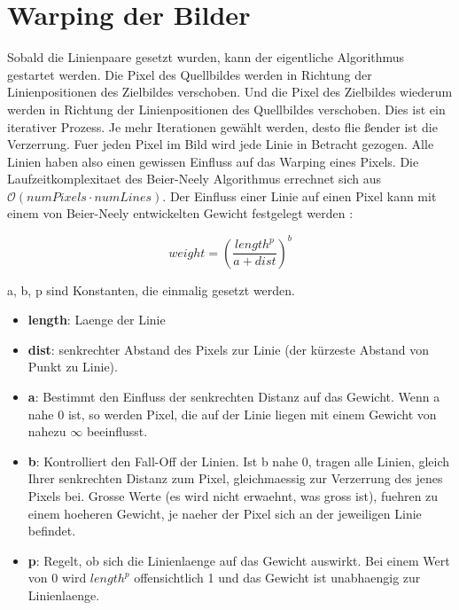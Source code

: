 \chapter{Warping der Bilder}

Sobald die Linienpaare gesetzt wurden, kann der eigentliche Algorithmus gestartet werden. Die Pixel
des Quellbildes werden in Richtung der Linienpositionen des Zielbildes verschoben. Und die Pixel
des Zielbildes wiederum werden in Richtung der Linienpositionen des Quellbildes verschoben.
Dies ist ein iterativer Prozess. Je mehr Iterationen gewählt werden, desto flie \ss ender ist
die Verzerrung.
Fuer jeden Pixel im Bild wird jede Linie in Betracht gezogen. Alle Linien haben also einen gewissen Einfluss auf
das Warping eines Pixels. Die Laufzeitkomplexitaet
des Beier-Neely Algorithmus errechnet sich aus
$\mathcal{O}(numPixels \cdot numLines)$.
Der Einfluss einer Linie auf einen Pixel kann mit einem
von Beier-Neely entwickelten Gewicht festgelegt werden
\cite{beierneely}:

\begin{equation}
	weight = \left(\frac{length^{p}}{a+dist}\right)^{b}
\end{equation}

a, b, p sind Konstanten, die einmalig gesetzt werden.

\begin{itemize}
	\item \textbf{length}: Laenge der Linie
	\item \textbf{dist}: senkrechter Abstand des Pixels zur Linie (der kürzeste Abstand
	von Punkt zu Linie).
	\item \textbf{a}: Bestimmt den Einfluss der senkrechten Distanz
	auf das Gewicht. Wenn a nahe 0 ist, so werden Pixel, die auf der
	Linie liegen mit einem Gewicht von nahezu $\infty$ beeinflusst.
	\item \textbf{b}: Kontrolliert den Fall-Off der Linien. Ist b
	nahe 0, tragen alle Linien, gleich Ihrer senkrechten Distanz zum
	Pixel, gleichmaessig zur Verzerrung des jenes Pixels bei.
	Grosse Werte (es wird nicht erwaehnt, was gross ist), fuehren
	zu einem hoeheren Gewicht, je naeher der Pixel sich an
	der jeweiligen Linie befindet.
	\item \textbf{p}: Regelt, ob sich die Linienlaenge auf das Gewicht
	auswirkt. Bei einem Wert von 0 wird $length^{p}$ offensichtlich 1
	und das Gewicht ist unabhaengig zur Linienlaenge.
\end{itemize}

